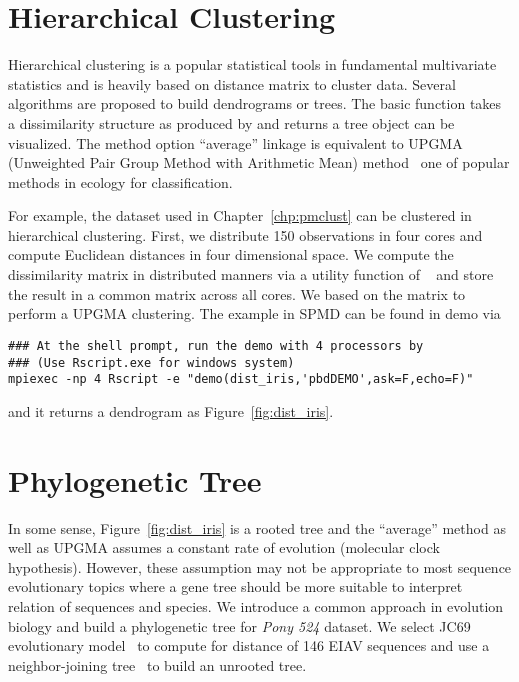 \section{Hierarchical Clustering}

Hierarchical clustering is a popular statistical tools in fundamental
multivariate statistics and is heavily based on distance matrix to cluster
data. Several algorithms are proposed to build dendrograms or trees.
The basic function 
takes a dissimilarity structure as
produced by  and returns a tree object can be visualized.
The method option ``average'' linkage is equivalent to
UPGMA (Unweighted Pair Group Method with Arithmetic Mean)
method~\citep{Sokal1985} one of popular methods in ecology for classification.

For example, the  dataset used in Chapter~\ref{chp:pmclust} can be
clustered in hierarchical clustering. First, we distribute 150 observations
in four cores and compute Euclidean distances in four dimensional space.
We compute the dissimilarity matrix in distributed manners via a
utility function 
of ~\citep{Chen2012pbdMPIpackage}
and store the result in a common matrix across all cores. We based on
the matrix to perform a UPGMA clustering. The example in SPMD can be
found in demo via
\begin{lstlisting}
### At the shell prompt, run the demo with 4 processors by
### (Use Rscript.exe for windows system)
mpiexec -np 4 Rscript -e "demo(dist_iris,'pbdDEMO',ask=F,echo=F)"
\end{lstlisting}
and it returns a dendrogram as Figure~\ref{fig:dist_iris}.



\section{Phylogenetic Tree}

In some sense, Figure~\ref{fig:dist_iris} is a rooted tree and the
``average'' method as well as UPGMA assumes a constant rate of evolution
(molecular clock hypothesis). However, these assumption may not be
appropriate to most sequence evolutionary topics where a gene tree should
be more suitable to interpret relation of sequences and species.
We introduce a common approach in evolution biology and build a
phylogenetic tree for {\it Pony 524} dataset.
We select JC69 evolutionary model~\citep{Jukes1969}
to compute for distance of 146 EIAV sequences and
use a neighbor-joining tree~\citep{Saitou1987} to build an unrooted tree.

